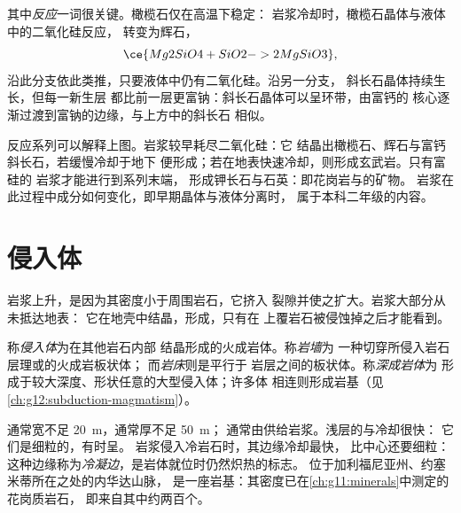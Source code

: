 其中\emph{反应}一词很关键。橄榄石仅在高温下稳定：
岩浆冷却时，橄榄石晶体与液体中的二氧化硅反应，
转变为辉石，
\[
  \ce{Mg2SiO4 + SiO2 -> 2 MgSiO3},
\]
沿此分支依此类推，只要液体中仍有二氧化硅。沿另一分支，
斜长石晶体持续生长，但每一新生层
都比前一层更富钠：斜长石晶体可以呈环带，由富钙的
核心逐渐过渡到富钠的边缘，与上方中的斜长石
相似。

反应系列可以解释上图。岩浆较早耗尽二氧化硅：它
结晶出橄榄石、辉石与富钙斜长石，若缓慢冷却于地下
便形成；若在地表快速冷却，则形成玄武岩。只有富硅的
岩浆才能进行到系列末端，
形成钾长石与石英：即花岗岩与的矿物。
岩浆在此过程中成分如何变化，即早期晶体与液体分离时，
属于本科二年级的内容。

\section{侵入体}

岩浆上升，是因为其密度小于周围岩石，它挤入
裂隙并使之扩大。岩浆大部分从未抵达地表：
它在地壳中结晶，形成，只有在
上覆岩石被侵蚀掉之后才能看到。

\begin{definition}[岩墙；岩床；深成岩体]\label{def:g11:igneous-rocks:intrusion}
称\emph{侵入体}为在其他岩石内部
结晶形成的火成岩体。称\emph{岩墙}为
一种切穿所侵入岩石层理或的火成岩板状体；
而\emph{岩床}则是平行于
岩层之间的板状体。称\emph{深成岩体}为
形成于较大深度、形状任意的大型侵入体；许多体
相连则形成岩基（见\cref{ch:g12:subduction-magmatism}）。
\end{definition}

通常宽不足 \qty{20}{m}，通常厚不足 \qty{50}{m}；
通常由供给岩浆。浅层的与冷却很快：
它们是细粒的，有时呈。
岩浆侵入冷岩石时，其边缘冷却最快，
比中心还要细粒：这种边缘称为\emph{冷凝边}，是岩体就位时仍然炽热的标志。
位于加利福尼亚州、约塞米蒂所在之处的内华达山脉，
是一座岩基：其密度已在\cref{ch:g11:minerals}中测定的花岗质岩石，
即来自其中约两百个。

